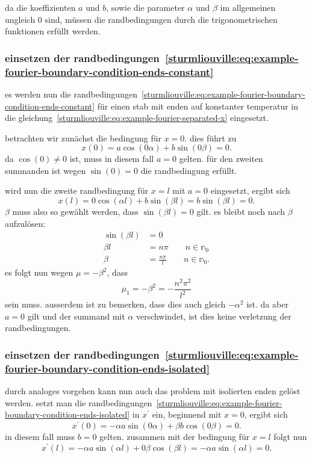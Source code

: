 da die koeffizienten $a$ und $b$, sowie die parameter $\alpha$ und $\beta$ im
allgemeinen ungleich $0$ sind, müssen die randbedingungen durch die
trigonometrischen funktionen erfüllt werden.

\subsubsection{einsetzen der 
randbedingungen~\eqref{sturmliouville:eq:example-fourier-boundary-condition-ends-constant}}

es werden nun die 
randbedingungen~\eqref{sturmliouville:eq:example-fourier-boundary-condition-ends-constant}
für einen stab mit enden auf konstanter temperatur in die
gleichung~\eqref{sturmliouville:eq:example-fourier-separated-x} eingesetzt.

betrachten wir zunächst die bedingung für $x = 0$.
dies führt zu
\[
    x(0)
    =
    a \cos(0 \alpha) + b \sin(0 \beta)
    =
    0.
\]
da $\cos(0) \neq 0$ ist, muss in diesem fall $a = 0$ gelten.
für den zweiten summanden ist wegen $\sin(0) = 0$ die randbedingung erfüllt.

wird nun die zweite randbedingung für $x = l$ mit $a = 0$ eingesetzt, ergibt
sich
\[
    x(l)
    =
    0 \cos(\alpha l) + b \sin(\beta l)
    =
    b \sin(\beta l)
    = 0.
\]
$\beta$ muss also so gewählt werden, dass $\sin(\beta l) = 0$ gilt.
es bleibt noch nach $\beta$ aufzulösen:
\[
\begin{aligned}
    \sin(\beta l) &= 0 \\
    \beta l &= n \pi \qquad n \in \mathbb{n}_0 \\
    \beta &= \frac{n \pi}{l} \qquad n \in \mathbb{n}_0.
\end{aligned}
\]
es folgt nun wegen $\mu = -\beta^{2}$, dass
\[
    \mu_1 = -\beta^{2} = -\frac{n^{2}\pi^{2}}{l^{2}}
\]
sein muss.
ausserdem ist zu bemerken, dass dies auch gleich $-\alpha^{2}$ ist.
da aber $a = 0$ gilt und der summand mit $\alpha$ verschwindet, ist dies keine
verletzung der randbedingungen.

\subsubsection{einsetzen der 
randbedingungen~\eqref{sturmliouville:eq:example-fourier-boundary-condition-ends-isolated}}

durch analoges vorgehen kann nun auch das problem mit isolierten enden gelöst
werden.
setzt man die 
randbedingungen~\eqref{sturmliouville:eq:example-fourier-boundary-condition-ends-isolated}
in $x^{\prime}$ ein, beginnend mit $x = 0$, ergibt sich
\[
    x^{\prime}(0)
    =
    -\alpha a \sin(0 \alpha) + \beta b \cos(0 \beta)
    = 0.
\]
in diesem fall muss $b = 0$ gelten.
zusammen mit der bedingung für $x = l$
folgt nun
\[
    x^{\prime}(l)
    =
    - \alpha a \sin(\alpha l) + 0 \beta \cos(\beta l)
    =
    - \alpha a \sin(\alpha l)
    = 0.
\]

